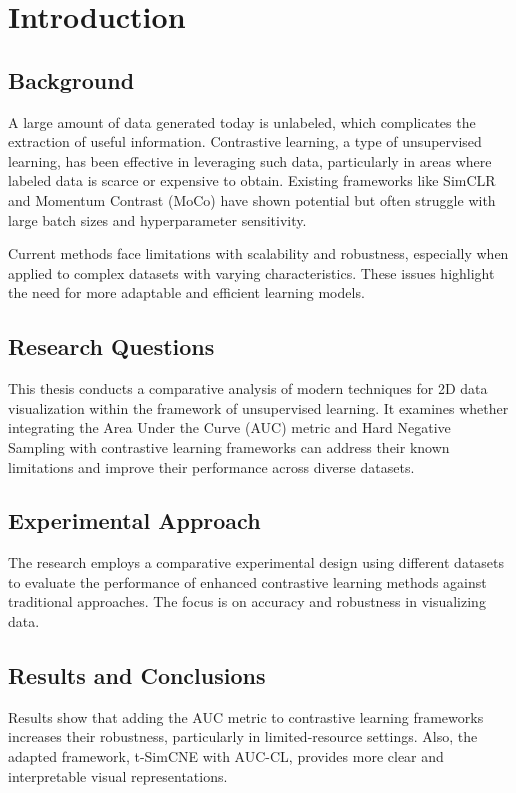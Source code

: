 \chapter{Introduction}
\label{chap:intro}

\section{Background}
A large amount of data generated today is unlabeled, which complicates the extraction of useful information. Contrastive learning, a type of unsupervised learning, has been effective in leveraging such data, particularly in areas where labeled data is scarce or expensive to obtain. Existing frameworks like SimCLR \cite{simclr} and Momentum Contrast (MoCo) \cite{moco} have shown potential but often struggle with large batch sizes and hyperparameter sensitivity.

Current methods face limitations with scalability and robustness, especially when applied to complex datasets with varying characteristics. These issues highlight the need for more adaptable and efficient learning models.

\section{Research Questions}
This thesis conducts a comparative analysis of modern techniques for 2D data visualization within the framework of unsupervised learning. It examines whether integrating the Area Under the Curve (AUC) metric \cite{sharma2023auc} and Hard Negative Sampling \cite{robinson2020contrastive} with contrastive learning frameworks can address their known limitations and improve their performance across diverse datasets.

\section{Experimental Approach}
The research employs a comparative experimental design using different datasets to evaluate the performance of enhanced contrastive learning methods against traditional approaches. The focus is on accuracy and robustness in visualizing data.

\section{Results and Conclusions}
Results show that adding the AUC metric to contrastive learning frameworks increases their robustness, particularly in limited-resource settings. Also, the adapted framework, t-SimCNE with AUC-CL, provides more clear and interpretable visual representations.

